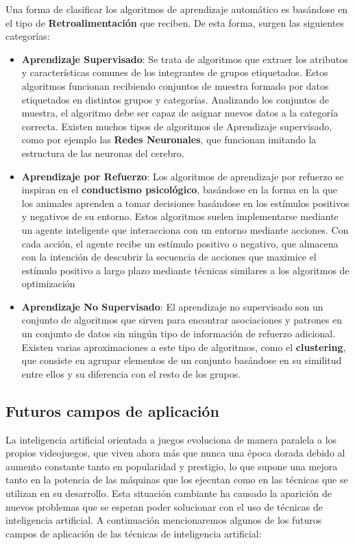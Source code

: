 Una forma de clasificar los algoritmos de aprendizaje automático es basándose en el tipo de \textbf{Retroalimentación} que reciben. De esta forma, surgen las siguientes categorías:
\begin{itemize}
\item \textbf{Aprendizaje Supervisado}: Se trata de algoritmos que extraer los atributos y características comunes de los integrantes de grupos etiquetados. Estos algoritmos funcionan recibiendo conjuntos de muestra formado por datos etiquetados en distintos grupos y categorías. Analizando los conjuntos de muestra, el algoritmo debe ser capaz de asignar nuevos datos a la categoría correcta. Existen muchos tipos de algoritmos de Aprendizaje supervisado, como por ejemplo las \textbf{Redes Neuronales}, que funcionan imitando la estructura de las neuronas del cerebro.
\item \textbf{Aprendizaje por Refuerzo}: Los algoritmos de aprendizaje por refuerzo se inspiran en el \textbf{conductismo psicológico}, basándose en la forma en la que los animales aprenden a tomar decisiones basándose en los estímulos positivos y negativos de su entorno. Estos algoritmos suelen implementarse mediante un agente inteligente que interacciona con un entorno mediante acciones. Con cada acción, el agente recibe un estímulo positivo o negativo, que almacena con la intención de descubrir la secuencia de acciones que maximice el estímulo positivo a largo plazo mediante técnicas similares a los algoritmos de optimización
\item \textbf{Aprendizaje No Supervisado}: El aprendizaje no supervisado son un conjunto de algoritmos que sirven para encontrar asociaciones y patrones en un conjunto de datos sin ningún tipo de información de refuerzo adicional. Existen varias aproximaciones a este tipo de algoritmos, como el \textbf{clustering}, que consiste en agrupar elementos de un conjunto basándose en su similitud entre ellos y su diferencia con el resto de los grupos.
\end{itemize} 

\subsection{Futuros campos de aplicación}
La inteligencia artificial orientada a juegos evoluciona de manera paralela a los propios videojuegos, que viven ahora más que nunca una época dorada debido al aumento constante tanto en popularidad y prestigio, lo que supone una mejora tanto en la potencia de las máquinas que los ejecutan como en las técnicas que se utilizan en su desarrollo. Esta situación cambiante ha causado la aparición de nuevos problemas que se esperan poder solucionar con el uso de técnicas de inteligencia artificial.\cite{ai_and_games} A continuación mencionaremos algunos de los futuros campos de aplicación de las técnicas de inteligencia artificial:

